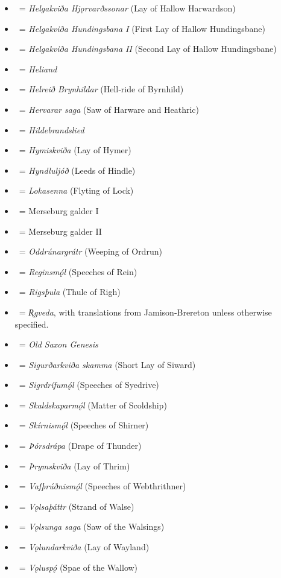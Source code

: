 \begin{itemize}
	\item \HelgakvidaHjorvardssonar\ = \emph{Helgakviða Hjǫrvarðssonar} (Lay of Hallow Harwardson)
	\item \HelgakvidaOne\ = \emph{Helgakviða Hundingsbana I} (First Lay of Hallow Hundingsbane)
	\item \HelgakvidaTwo\ = \emph{Helgakviða Hundingsbana II} (Second Lay of Hallow Hundingsbane)
	\item \Heliand\ = \emph{Heliand}
	\item \Helreid\ = \emph{Helreið Brynhildar} (Hell‑ride of Byrnhild)
	\item \HervararSaga\ = \emph{Hervarar saga} (Saw of Harware and Heathric)
	\item \Hildebrandslied\ = \emph{Hildebrandslied}
	\item \Hymiskvida\ = \emph{Hymiskviða} (Lay of Hymer)
	\item \Hyndluljod\ = \emph{Hyndluljóð} (Leeds of Hindle)
	\item \Lokasenna\ = \emph{Lokasenna} (Flyting of Lock)
	\item \MerseburgOne\ = Merseburg galder I
	\item \MerseburgTwo\ = Merseburg galder II
	\item \Oddrunargratr\ = \emph{Oddrúnargrátr} (Weeping of Ordrun)
	\item \Reginsmal\ = \emph{Reginsmǫ́l} (Speeches of Rein)
	\item \Rigsthula\ = \emph{Rigsþula} (Thule of Righ)
	\item \Rigveda\ = \emph{R̥gveda}, with translations from Jamison‑Brereton unless otherwise specified.
	\item \SaxonGenesis\ = \emph{Old Saxon Genesis}
	\item \Sigurdskamma\ = \emph{Sigurðarkviða skamma} (Short Lay of Siward)
	\item \Sigrdrifumal\ = \emph{Sigrdrífumǫ́l} (Speeches of Syedrive)
	\item \Skaldskaparmal\ = \emph{Skaldskaparmǫ́l} (Matter of Scoldship)
	\item \Skirnismal\ = \emph{Skírnismǫ́l} (Speeches of Shirner)
	\item \Thorsdrapa\ = \emph{Þórsdrápa} (Drape of Thunder)
	\item \Thrymskvida\ = \emph{Þrymskviða} (Lay of Thrim)
	\item \Vafthrudnismal\ = \emph{Vafþrúðnismǫ́l} (Speeches of Webthrithner)
	\item \Volsathattr\ = \emph{Vǫlsaþáttr} (Strand of Walse)
	\item \VolsungaSaga\ = \emph{Vǫlsunga saga} (Saw of the Walsings)
	\item \Volundarkvida\ = \emph{Vǫlundarkviða} (Lay of Wayland)
	\item \Voluspa\ = \emph{Vǫluspǫ́} (Spae of the Wallow)
\end{itemize}%


